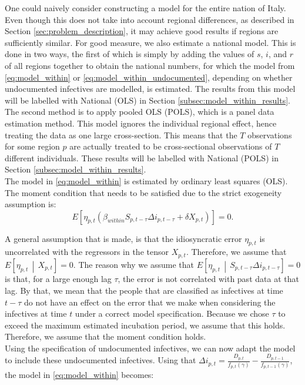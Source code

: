\documentclass[12pt]{article}
\begin{document}
	One could naively consider constructing a model for the entire nation of Italy. Even though this does not take into account regional differences, as described in Section \ref{sec:problem_description}, it may achieve good results if regions are sufficiently similar. For good measure, we also estimate a national model. This is done in two ways, the first of which is simply by adding the values of $s$, $i$, and $r$ of all regions together to obtain the national numbers, for which the model from \eqref{eq:model_within} or \eqref{eq:model_within_undocumented}, depending on whether undocumented infectives are modelled, is estimated. The results from this model will be labelled with National (OLS) in Section \ref{subsec:model_within_results}. The second method is to apply pooled OLS (POLS), which is a panel data estimation method. This model ignores the individual regional effect, hence treating the data as one large cross-section. This means that the $T$ observations for some region $p$ are actually treated to be cross-sectional observations of $T$ different individuals. These results will be labelled with National (POLS) in Section \ref{subsec:model_within_results}. \\
	
	The model in \ref{eq:model_within} is estimated by ordinary least squares (OLS). The moment condition that needs to be satisfied due to the strict exogeneity assumption is:
	    \[E\left[ \eta_{p,t} \left( \beta_{within}S_{p,t-\tau}\Delta i_{p,t-\tau} + \delta X_{p,t} \right) \right] = 0.\]
	
	A general assumption that is made, is that the idiosyncratic error $\eta_{p,t}$ is uncorrelated with the regressors in the tensor $X_{p,t}$. Therefore, we assume that $E\left[\eta_{p,t} \,\middle|\, X_{p,t}\right] = 0$. The reason why we assume that $E\left[\eta_{p,t} \,\middle|\, S_{p,t-\tau}\Delta i_{p,t-\tau}\right] = 0$ is that, for a large enough lag $\tau$, the error is not correlated with past data at that lag. By that, we mean that the people that are classified as infectives at time $t-\tau$ do not have an effect on the error that we make when considering the infectives at time $t$ under a correct model specification. Because we chose $\tau$ to exceed the maximum estimated incubation period, we assume that this holds. Therefore, we assume that the moment condition holds. \\
	
	Using the specification of undocumented infectives, we can now adapt the model to include these undocumented infectives. Using that $\Delta i_{p,t} = \frac{D_{p,t}}{f_{p,t}(\gamma)} - \frac{D_{p,t-1}}{f_{p,t-1}(\gamma)}$, the model in \eqref{eq:model_within} becomes:
	
\end{document}
